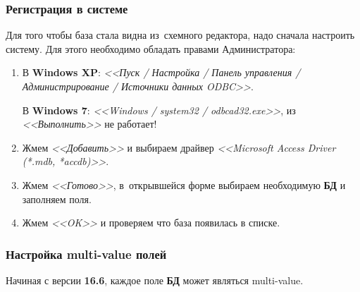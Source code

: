 \subsubsection{Регистрация в системе} \label{sssec:bd_install}
Для того чтобы база стала видна из~схемного редактора, надо сначала настроить систему. Для этого необходимо обладать правами Администратора:
\begin{enumerate}
	\item В \textbf{Windows XP}: \textit{<<Пуск / Настройка / Панель управления / Администрирование / Источники данных ODBC>>}.
	
	В \textbf{Windows 7}: \textit{<<Windows / system32 / odbcad32.exe>>}, из \textit{<<Выполнить>>} не работает! 
	
	\begin{figure}[H]
	\end{figure}
	
	\item Жмем \textit{<<Добавить>>} и выбираем драйвер \textit{<<Microsoft Access Driver (*.mdb, *accdb)>>}.
	
	\begin{figure}[H]
	\end{figure}
	
	
	\item Жмем \textit{<<Готово>>}, в~открывшейся форме выбираем необходимую \textbf{БД} и заполняем поля.
	
	\begin{figure}[H]
	\end{figure}
	
	\item Жмем \textit{<<OK>>} и проверяем что база появилась в списке.
\end{enumerate}



\subsubsection{Настройка multi-value полей} \label{sssec:bd_multi_value}

Начиная с версии \textbf{16.6}, каждое поле \textbf{БД} может являться multi-value.

